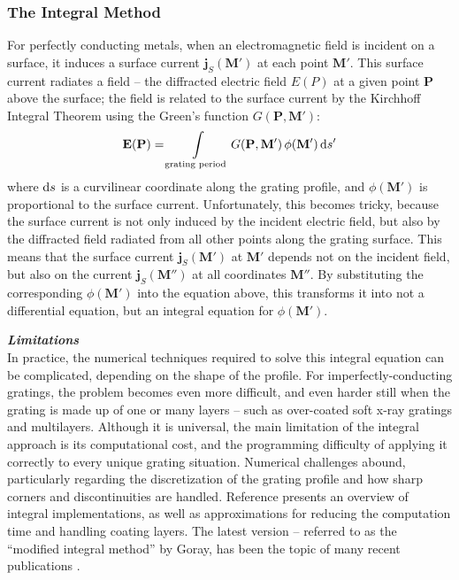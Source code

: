 \subsubsection{The Integral Method}
For perfectly conducting metals, when an electromagnetic field is incident on a surface, it induces a surface current $\mathbf{j}_S(\mathbf{M}')$ at each point $\mathbf{M}'$.  This surface current radiates a field -- the diffracted electric field $E(P)$ at a given point $\mathbf{P}$ above the surface; the field is related to the surface current by the Kirchhoff Integral Theorem \cite{Kir83} using the Green's function $G(\mathbf{P}, \mathbf{M}')$:
\begin{align}
\mathbf{E}(\mathbf{P}) = \int\limits_{\textrm{grating period}} G(\mathbf{P}, \mathbf{M}')\, \phi(\mathbf{M}')\, \mathrm{d} s'
\end{align}
where $\mathrm{d} s$ is a curvilinear coordinate along the grating profile, and $\phi(\mathbf{M'})$ is proportional to the surface current.  Unfortunately, this becomes tricky, because the surface current is not only induced by the incident electric field, but also by the diffracted field radiated from all other points along the grating surface.  This means that the surface current $\mathbf{j}_S(\mathbf{M}')$ at $\mathbf{M}'$ depends not on the incident field, but also on the current $\mathbf{j}_S(\mathbf{M}'')$ at all coordinates $\mathbf{M}''$.  By substituting the corresponding $\phi(\mathbf{M'})$ into the equation above, this transforms it into not a differential equation, but an integral equation for $\phi(\mathbf{M'})$.  
 
\noindent\textbf{\emph{Limitations}}\\
In practice, the numerical techniques required to solve this integral equation can be complicated, depending on the shape of the profile.  For imperfectly-conducting gratings, the problem becomes even more difficult, and even harder still when the grating is made up of one or many layers -- such as over-coated soft x-ray gratings and multilayers.  Although it is universal, the main limitation of the integral approach is its computational cost, and the programming difficulty of applying it correctly to every unique grating situation. Numerical challenges abound, particularly regarding the discretization of the grating profile and how sharp corners and discontinuities are handled.  Reference \cite{Pom91} presents an overview of integral implementations, as well as approximations for reducing the computation time and handling coating layers. The latest version -- referred to as the ``modified integral method'' by Goray, has been the topic of many recent publications \cite{Gor02} \cite {Gor02b} \cite{See02} \cite{Gor05}.
 
